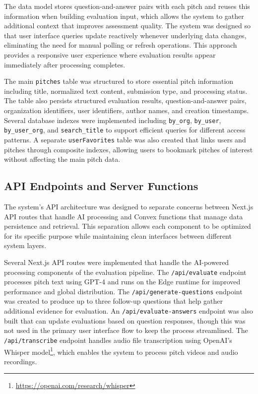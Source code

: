 The data model stores question-and-answer pairs with each pitch and reuses this information when building evaluation input, which allows the system to gather additional context that improves assessment quality. The system was designed so that user interface queries update reactively whenever underlying data changes, eliminating the need for manual polling or refresh operations. This approach provides a responsive user experience where evaluation results appear immediately after processing completes.

The main \texttt{pitches} table was structured to store essential pitch information including title, normalized text content, submission type, and processing status. The table also persists structured evaluation results, question-and-answer pairs, organization identifiers, user identifiers, author names, and creation timestamps. Several database indexes were implemented including \texttt{by\_org}, \texttt{by\_user}, \texttt{by\_user\_org}, and \texttt{search\_title} to support efficient queries for different access patterns. A separate \texttt{userFavorites} table was also created that links users and pitches through composite indexes, allowing users to bookmark pitches of interest without affecting the main pitch data.

\subsection{API Endpoints and Server Functions}\label{subsec:api-and-server}
The system's API architecture was designed to separate concerns between Next.js API routes that handle AI processing and Convex functions that manage data persistence and retrieval. This separation allows each component to be optimized for its specific purpose while maintaining clean interfaces between different system layers.

Several Next.js API routes were implemented that handle the AI-powered processing components of the evaluation pipeline. The \texttt{/api/evaluate} endpoint processes pitch text using GPT-4 and runs on the Edge runtime for improved performance and global distribution. The \texttt{/api/generate-questions} endpoint was created to produce up to three follow-up questions that help gather additional evidence for evaluation. An \texttt{/api/evaluate-answers} endpoint was also built that can update evaluations based on question responses, though this was not used in the primary user interface flow to keep the process streamlined. The \texttt{/api/transcribe} endpoint handles audio file transcription using OpenAI's Whisper model\footnote{\url{https://openai.com/research/whisper}}, which enables the system to process pitch videos and audio recordings.

